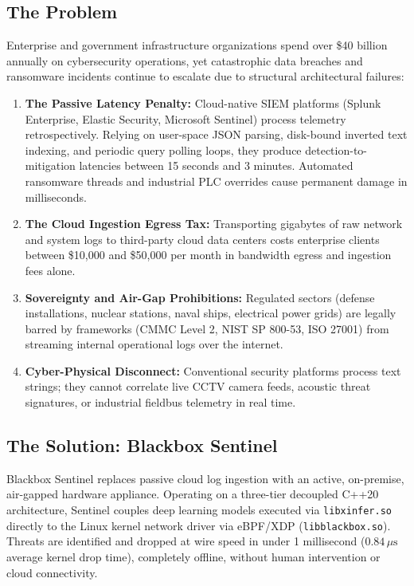 \documentclass[11pt,a4paper]{article}
\begin{document}
\subsection{The Problem}
Enterprise and government infrastructure organizations spend over \$40 billion annually on cybersecurity operations, yet catastrophic data breaches and ransomware incidents continue to escalate due to structural architectural failures:
\begin{enumerate}
    \item \textbf{The Passive Latency Penalty:} Cloud-native SIEM platforms (Splunk Enterprise, Elastic Security, Microsoft Sentinel) process telemetry retrospectively. Relying on user-space JSON parsing, disk-bound inverted text indexing, and periodic query polling loops, they produce detection-to-mitigation latencies between 15 seconds and 3 minutes. Automated ransomware threads and industrial PLC overrides cause permanent damage in milliseconds.
    \item \textbf{The Cloud Ingestion Egress Tax:} Transporting gigabytes of raw network and system logs to third-party cloud data centers costs enterprise clients between \$10,000 and \$50,000 per month in bandwidth egress and ingestion fees alone.
    \item \textbf{Sovereignty and Air-Gap Prohibitions:} Regulated sectors (defense installations, nuclear stations, naval ships, electrical power grids) are legally barred by frameworks (CMMC Level 2, NIST SP 800-53, ISO 27001) from streaming internal operational logs over the internet.
    \item \textbf{Cyber-Physical Disconnect:} Conventional security platforms process text strings; they cannot correlate live CCTV camera feeds, acoustic threat signatures, or industrial fieldbus telemetry in real time.
\end{enumerate}

\subsection{The Solution: Blackbox Sentinel}
Blackbox Sentinel replaces passive cloud log ingestion with an active, on-premise, air-gapped hardware appliance. Operating on a three-tier decoupled C++20 architecture, Sentinel couples deep learning models executed via \texttt{libxinfer.so} directly to the Linux kernel network driver via eBPF/XDP (\texttt{libblackbox.so}). Threats are identified and dropped at wire speed in under 1 millisecond ($0.84\,\mu\text{s}$ average kernel drop time), completely offline, without human intervention or cloud connectivity.
\end{document}
